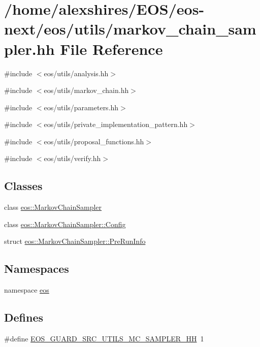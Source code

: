 \hypertarget{markov__chain__sampler_8hh}{
\section{/home/alexshires/EOS/eos-\/next/eos/utils/markov\_\-chain\_\-sampler.hh File Reference}
\label{markov__chain__sampler_8hh}
}
{\ttfamily \#include $<$eos/utils/analysis.hh$>$}\par
{\ttfamily \#include $<$eos/utils/markov\_\-chain.hh$>$}\par
{\ttfamily \#include $<$eos/utils/parameters.hh$>$}\par
{\ttfamily \#include $<$eos/utils/private\_\-implementation\_\-pattern.hh$>$}\par
{\ttfamily \#include $<$eos/utils/proposal\_\-functions.hh$>$}\par
{\ttfamily \#include $<$eos/utils/verify.hh$>$}\par
\subsection*{Classes}
\begin{DoxyCompactItemize}
\item 
class \hyperlink{classeos_1_1MarkovChainSampler}{eos::MarkovChainSampler}
\item 
class \hyperlink{classeos_1_1MarkovChainSampler_1_1Config}{eos::MarkovChainSampler::Config}
\item 
struct \hyperlink{structeos_1_1MarkovChainSampler_1_1PreRunInfo}{eos::MarkovChainSampler::PreRunInfo}
\end{DoxyCompactItemize}
\subsection*{Namespaces}
\begin{DoxyCompactItemize}
\item 
namespace \hyperlink{namespaceeos}{eos}
\end{DoxyCompactItemize}
\subsection*{Defines}
\begin{DoxyCompactItemize}
\item 
\#define \hyperlink{markov__chain__sampler_8hh_a564984576aa31b9ed76d28c2b0bd2b2f}{EOS\_\-GUARD\_\-SRC\_\-UTILS\_\-MC\_\-SAMPLER\_\-HH}~1
\end{DoxyCompactItemize}
